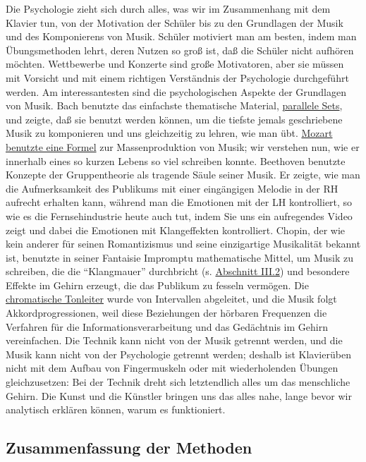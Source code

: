 Die Psychologie zieht sich durch alles, was wir im Zusammenhang mit dem Klavier tun, von der Motivation der Schüler bis zu den Grundlagen der Musik und des Komponierens von Musik.
Schüler motiviert man am besten, indem man Übungsmethoden lehrt, deren Nutzen so groß ist, daß die Schüler nicht aufhören möchten.
Wettbewerbe und Konzerte sind große Motivatoren, aber sie müssen mit Vorsicht und mit einem richtigen Verständnis der Psychologie durchgeführt werden.
Am interessantesten sind die psychologischen Aspekte der Grundlagen von Musik.
Bach benutzte das einfachste thematische Material, \hyperref[c1iii20ps]{parallele Sets}, und zeigte, daß sie benutzt werden können, um die tiefste jemals geschriebene Musik zu komponieren und uns gleichzeitig zu lehren, wie man übt.
\hyperref[c1iv4]{Mozart benutzte eine Formel} zur Massenproduktion von Musik;
wir verstehen nun, wie er innerhalb eines so kurzen Lebens so viel schreiben konnte.
Beethoven benutzte Konzepte der Gruppentheorie als tragende Säule seiner Musik.
Er zeigte, wie man die Aufmerksamkeit des Publikums mit einer eingängigen Melodie in der RH aufrecht erhalten kann, während man die Emotionen mit der LH kontrolliert, so wie es die Fernsehindustrie heute auch tut, indem Sie uns ein aufregendes Video zeigt und dabei die Emotionen mit Klangeffekten kontrolliert.
Chopin, der wie kein anderer für seinen Romantizismus und seine einzigartige Musikalität bekannt ist, benutzte in seiner Fantaisie Impromptu mathematische Mittel, um Musik zu schreiben, die die \enquote{Klangmauer} durchbricht (s. \hyperref[c1iii2]{Abschnitt III.2}) und besondere Effekte im Gehirn erzeugt, die das Publikum zu fesseln vermögen.
Die \hyperref[c2_2]{chromatische Tonleiter} wurde von Intervallen abgeleitet, und die Musik folgt Akkordprogressionen, weil diese Beziehungen der hörbaren Frequenzen die Verfahren für die Informationsverarbeitung und das Gedächtnis im Gehirn vereinfachen.
Die Technik kann nicht von der Musik getrennt werden, und die Musik kann nicht von der Psychologie getrennt werden; deshalb ist Klavierüben nicht mit dem Aufbau von Fingermuskeln oder mit wiederholenden Übungen gleichzusetzen: Bei der Technik dreht sich letztendlich alles um das menschliche Gehirn.
Die Kunst und die Künstler bringen uns das alles nahe, lange bevor wir analytisch erklären können, warum es funktioniert.


\subsection{Zusammenfassung der Methoden}
\label{c1iii22}

